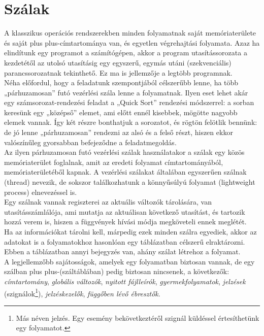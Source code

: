 \documentclass[tikz,12pt,margin=0px]{article}
\newcommand\lword[1]{\leavevmode\nobreak\hskip0pt plus\linewidth\penalty50\hskip0pt plus-\linewidth\nobreak #1}
\begin{document}
    \section*{Szálak}

    \noindent A klasszikus operációs rendszerekben minden folyamatnak saját memóriaterülete és saját \lword{címtartománya} van, és egyetlen végrehajtási folyamata. Azaz ha elindítunk egy programot a számítógépen, akkor a program utasítássorozata a kezdetétől az utolsó utasításig egy egyszerű, egymás utáni (szekvenciális) parancssorozatnak tekinthető. Ez ma is jellemzője a legtöbb programnak.\\

    \noindent Néha előfordul, hogy a feladatunk szempontjából célszerűbb lenne, ha több „párhuzamosan” futó vezérlési szála lenne a folyamatnak. Ilyen eset lehet akár egy számsorozat-rendezési feladat a „Quick Sort” rendezési módszerrel: a sorban keresünk egy „középső” elemet, ami előtt ennél kisebbek, mögötte nagyobb elemek vannak. Így két részre bonthatjuk a sorozatot, és rögtön felötlik bennünk: de jó lenne „párhuzamosan” rendezni az alsó és a felső részt, hiszen ekkor valószínűleg gyorsabban befejeződne a feladatmegoldás.\\

    \noindent Az ilyen párhuzamosan futó vezérlési szálak használatakor a szálak egy közös memóriaterület foglalnak, amit az eredeti folyamat címtartományából, memóriaterületéből kapnak. A vezérlési szálakat általában egyszerűen szálnak (thread) nevezik, de sokszor találkozhatunk a könnyűsúlyú folyamat (lightweight process) elnevezéssel is.\\

    \noindent Egy szálnak vannak regiszterei az aktuális változók tárolására, van utasításszámlálója, ami mutatja az aktuálisan következő utasítást, és tartozik hozzá verem is, hiszen a függvények hívási módja megköveteli ennek meglétét.\\

    \noindent Ha az információkat tárolni kell, márpedig ezek minden szálra egyediek, akkor az adatokat is a folyamatokhoz hasonlóan egy táblázatban célszerű elraktározni. Ebben a táblázatban annyi bejegyzés van, ahány szálat létrehoz a folyamat.\\

    \noindent A legjellemzőbb sajátosságok, amelyek egy folyamatban biztosan vannak, de egy szálban \lword{(száltáblában)} pedig biztosan nincsenek, a következők:
        \emph{címtartomány}, \emph{globális változók}, \emph{nyitott fájlleírók}, \emph{gyermekfolyamatok}, \emph{jelzések} (szignálok\footnote{Más néven jelzés. Egy esemény bekövetkeztéről szignál küldéssel értesíthetünk egy folyamatot.}), \emph{jelzéskezelők}, \emph{függőben lévő ébresztők}.\\
\end{document}
